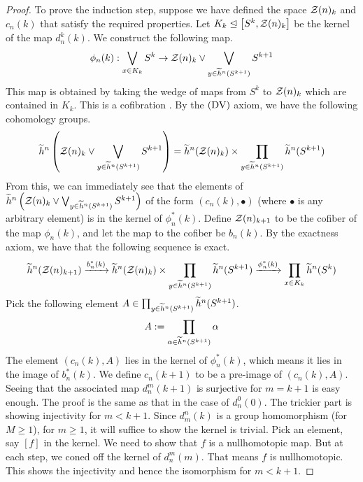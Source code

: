 \begin{proof}
  To prove the induction step, suppose we have defined the space $\mathcal{Z}(n)_k$ and $c_n(k)$ that
  satisfy the required properties. Let $K_k \trianglelefteq \left[ S^k, \mathcal{Z}(n)_k \right]$
   be the kernel of the map $d_n^k(k)$.  We construct the following map.
  \begin{align*}
    \phi_n(k): \bigvee_{x \in K_k} S^k \to \mathcal{Z}(n)_k \vee \bigvee_{y \in \widetilde{h}^n(S^{k+1})} S^{k+1}
  \end{align*}
  This map is obtained by taking the wedge of maps from $S^k$ to $\mathcal{Z}(n)_k$ which are contained in
  $K_k$.  This is a cofibration . By the $(\mathrm{DV})$ axiom, we have the following cohomology
  groups.
  \begin{align*}
    \widetilde{h}^n \left( \mathcal{Z}(n)_k \vee \bigvee_{y \in \widetilde{h}^n(S^{k+1})} S^{k+1} \right) = \widetilde{h}^n(\mathcal{Z}(n)_k) \times \prod_{y \in \widetilde{h}^n(S^{k+1})} \widetilde{h}^n(S^{k+1})
  \end{align*}
  From this, we can immediately see that the elements of
  $\widetilde{h}^n \left( \mathcal{Z}(n)_k \vee \bigvee_{y \in \widetilde{h}^n(S^{k+1})} S^{k+1} \right)$ of the form
  $(c_n(k), \bullet)$ (where $\bullet$ is any arbitrary element) is in the kernel of
  $\phi_n^{\ast}(k)$.  Define $\mathcal{Z}(n)_{k+1}$ to be the cofiber of the map $\phi_n(k)$, and let the
  map to the cofiber be $b_n(k)$.  By the exactness axiom, we have that the following sequence is
  exact.
  \begin{align*}
    \widetilde{h}^n(\mathcal{Z}(n)_{k+1}) \xrightarrow{b_n^{\ast}(k)}  \widetilde{h}^n(\mathcal{Z}(n)_k) \times \prod_{y \in \widetilde{h}^n(S^{k+1})} \widetilde{h}^n(S^{k+1})
    \xrightarrow{\phi_n^{\ast}(k)} \prod_{x \in K_k} \widetilde{h}^n(S^k)
  \end{align*}
  Pick the following element $A \in \prod_{y \in \widetilde{h}^n(S^{k+1})} \widetilde{h}^n(S^{k+1})$.
  \begin{align*}
    A := \prod_{\alpha \in \widetilde{h}^n(S^{k+1})} \alpha
  \end{align*}
  The element $(c_n(k), A)$ lies in the kernel of $\phi_n^{\ast}(k)$, which means it lies in the
  image of $b_n^{\ast}(k)$. We define $c_n(k+1)$ to be a pre-image of $(c_n(k), A)$. Seeing that the
  associated map $d_n^m(k+1)$ is surjective for $m=k+1$ is easy enough. The proof is the same as
  that in the case of $d_n^0(0)$. The trickier part is showing injectivity for $m < k+1$. Since $d_m^n(k)$ is
  a group homomorphism (for $M \geq 1$), for $m \geq 1$, it will suffice to show the kernel is
  trivial.    Pick an element, say $[f]$ in the
  kernel. We need to show that $f$ is a nullhomotopic map. But at each step, we coned off the kernel
  of $d_n^m(m)$. That means $f$ is nullhomotopic. This shows the injectivity and hence the
  isomorphism for $m < k+1$.


\end{proof}
